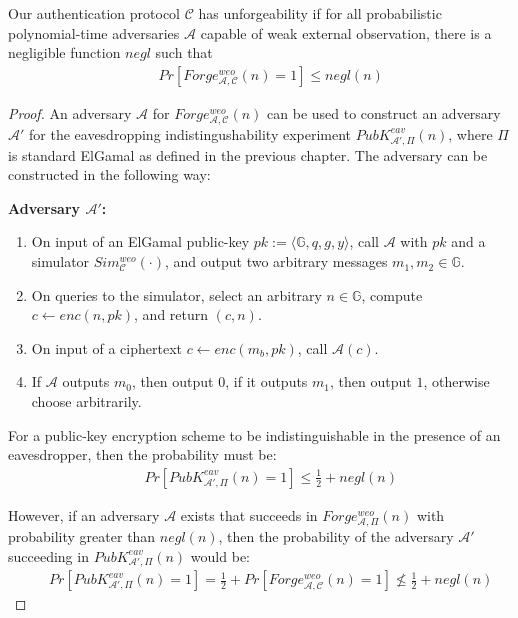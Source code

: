 \begin{proposition}\label{proposition:ex-forge}
Our authentication protocol $\mathcal{C}$ has unforgeability if for all probabilistic polynomial-time adversaries $\mathcal{A}$ capable of weak external observation, there is a negligible function $negl$ such that
{\setlength{\mathindent}{0cm}
\begin{align*}
&&    Pr\left[ Forge^{weo}_{\mathcal{A}, \mathcal{C}}(n)  = 1 \right] \leq negl(n) 
\end{align*}}
\end{proposition}

\begin{proof}
 An adversary $\mathcal{A}$ for $Forge^{weo}_{\mathcal{A}, \mathcal{C}}(n)$ can be used to construct an adversary $\mathcal{A'}$ for the eavesdropping indistingushability experiment $PubK^{eav}_{\mathcal{A'}, \Pi}(n)$, where $\Pi$ is standard ElGamal as defined in the previous chapter. The adversary can be constructed in the following way:\newline

\textbf{Adversary $\mathcal{A}'$:}
\begin{enumerate}
    \item On input of an ElGamal public-key $pk := \langle \mathbb{G}, q, g, y \rangle$, call $\mathcal{A}$ with $pk$ and a simulator $Sim^{weo}_\mathcal{C}(\cdot)$, and output two arbitrary messages $m_1, m_2 \in \mathbb{G}$.
    \item On queries to the simulator, select an arbitrary $n \in \mathbb{G}$, compute $c \leftarrow enc(n,pk)$, and return $(c, n)$.
    \item On input of a ciphertext $c \leftarrow enc(m_b, pk)$, call $\mathcal{A}(c)$.
    \item If $\mathcal{A}$ outputs $m_0$, then output $0$, if it outputs $m_1$, then output $1$, otherwise choose arbitrarily.
\end{enumerate}


For a public-key encryption scheme to be indistinguishable in the presence of an eavesdropper, then the probability must be:
{\setlength{\mathindent}{0cm}
\begin{align*}
&& Pr\left[ PubK^{eav}_{\mathcal{A'}, \Pi}(n)  = 1 \right] \leq \frac{1}{2} + negl(n)
\end{align*}}

However, if an adversary $\mathcal{A}$ exists that succeeds in $Forge^{weo}_{\mathcal{A}, \Pi}(n)$ with probability greater than $negl(n)$, then the probability of the adversary $\mathcal{A}'$ succeeding in $PubK^{eav}_{\mathcal{A'}, \Pi}(n)$ would be:
{\setlength{\mathindent}{0cm}
\begin{align*}
&& Pr\left[ PubK^{eav}_{\mathcal{A'}, \Pi}(n)  = 1 \right] = \frac{1}{2} + Pr \left[ Forge^{weo}_{\mathcal{A}, \mathcal{C}}(n)  = 1 \right] \not\leq \frac{1}{2} + negl(n)
\end{align*}}


\end{proof}
